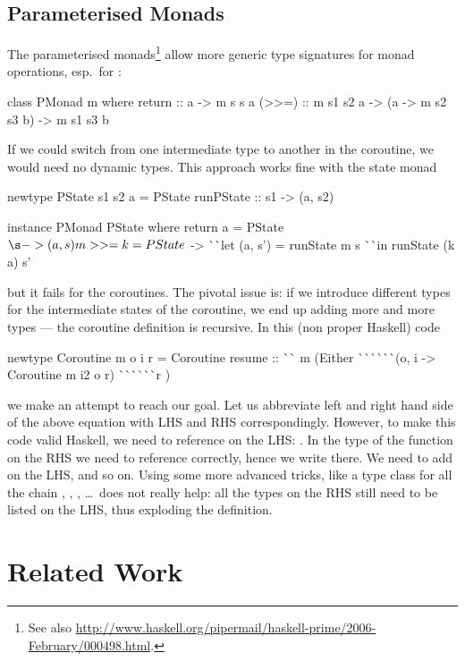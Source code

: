 \subsection{Parameterised Monads}
The parameterised monads\footnote{See also \url{http://www.haskell.org/pipermail/haskell-prime/2006-February/000498.html}.}  allow more generic type signatures for monad operations, esp.\ for \hs{>>=}\xspace\nolinebreak[4] \cite{CambridgeJournals:8240527,Ghani:2005:MAG:1090189.1086403,monad-parametrisable}:
\begin{code}
class PMonad m where
  return :: a -> m s s a
  (>>=)  :: m s1 s2 a -> (a -> m s2 s3 b) -> m s1 s3 b
\end{code}
If we could switch from one  intermediate type to another in the coroutine, we would need no dynamic types.
This approach works fine with the state monad
\begin{code}
newtype PState s1 s2 a
  = PState { runPState :: s1 -> (a, s2) }

instance PMonad PState where
  return a  = PState $ \s -> (a, s)
  m >>= k   = PState $ \s ->
                ^^ ^^ let (a, s') = runState m s
                ^^ ^^ in  runState (k a) s'
\end{code}
but it fails for the coroutines.
The pivotal issue is: if we introduce different types for the intermediate states of the coroutine, we end up adding more and more types --- the coroutine definition is recursive.
In this (non proper Haskell) code
\begin{code}
newtype Coroutine m o i r
  =  Coroutine { resume ::
       ^^ ^^  m (Either
       ^^ ^^ ^^ ^^ ^^ ^^ (o, i -> Coroutine m i2 o r)
       ^^ ^^ ^^ ^^ ^^ ^^ r 
       )}
\end{code}
we make an attempt to reach our goal.
Let us abbreviate left and right hand side of the above equation with LHS and RHS correspondingly.
However, to make this code valid Haskell, we need to reference  on the LHS: .
In the type of the  function on the RHS we need to reference  correctly, hence we write  there.
We need to add  on the LHS, and so on.
Using some more advanced tricks, like a type class for all the chain , , , \dots\ does not really help: all the types on the RHS still need to be listed on the LHS, thus exploding the definition.

\section{Related Work}
\label{sec:related-work}

